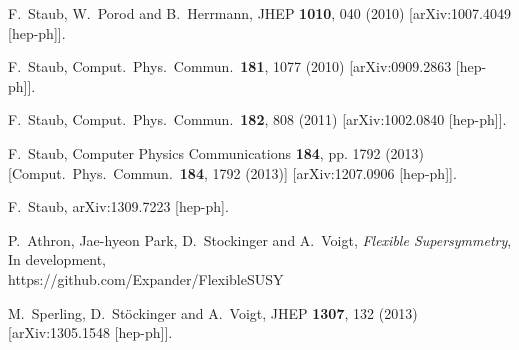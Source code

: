 \documentclass[final,3p,times,pdflatex]{elsarticle}
\begin{document}
\begin{thebibliography}{10}
  F.~Staub, W.~Porod and B.~Herrmann,
  JHEP {\bf 1010}, 040 (2010)
  [arXiv:1007.4049 [hep-ph]].

  F.~Staub,
  Comput.\ Phys.\ Commun.\  {\bf 181}, 1077 (2010)
  [arXiv:0909.2863 [hep-ph]].

  F.~Staub,
  Comput.\ Phys.\ Commun.\  {\bf 182}, 808 (2011)
  [arXiv:1002.0840 [hep-ph]].

  F.~Staub,
  Computer Physics Communications {\bf 184}, pp. 1792 (2013)
  [Comput.\ Phys.\ Commun.\  {\bf 184}, 1792 (2013)]
  [arXiv:1207.0906 [hep-ph]].

  F.~Staub,
  arXiv:1309.7223 [hep-ph].

P.~Athron, Jae-hyeon Park, D.~Stockinger and A.~Voigt, {\it Flexible Supersymmetry}, In development, \\
https://github.com/Expander/FlexibleSUSY

  M.~Sperling, D.~Stöckinger and A.~Voigt,
  JHEP {\bf 1307}, 132 (2013)
  [arXiv:1305.1548 [hep-ph]].


\end{thebibliography}
\end{document}

